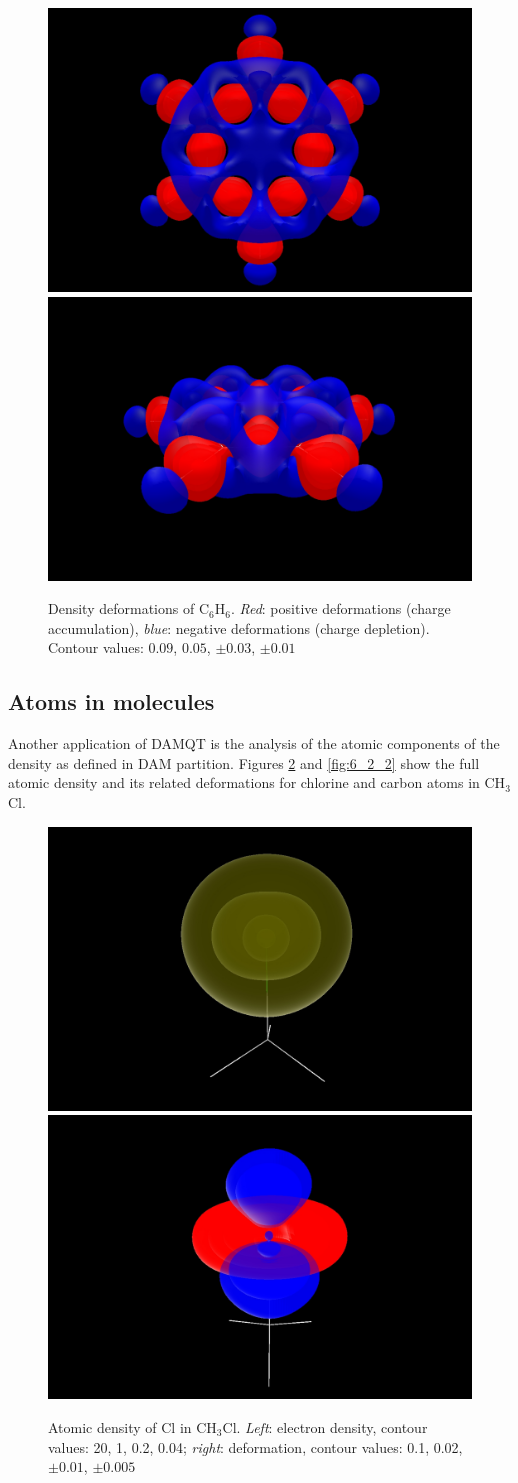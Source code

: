 \documentclass[10pt]{article}
\begin{document}
\begin{figure}[H]
\begin{center}
\includegraphics[width=.33\linewidth]{C6H6-pVTZ-def-1.png}
\hspace*{5mm}
\includegraphics[width=.33\linewidth]{C6H6-pVTZ-def-2.png}
\vspace*{0.cm}
\end{center}
\caption[Density deformations of C$_6$H$_6$]{ Density deformations of C$_6$H$_6$. {\it Red}: positive deformations
(charge accumulation),
{\it blue}: negative deformations (charge depletion). Contour values:
$0.09$, $0.05$, $\pm 0.03$, $\pm 0.01$ \label{fig:6_1_4}}
\end{figure}

\subsection{Atoms in molecules \label{sec:6.2}}

Another application of DAMQT is the analysis of the atomic components
of the density as defined in DAM partition. Figures \ref{fig:6_2_1} and
\ref{fig:6_2_2} show the full atomic density and its related deformations for
chlorine and carbon atoms in CH$_3$Cl.

\begin{figure}[H]
\begin{center}
\includegraphics[width=.31\linewidth]{CH3Cl-pVTZ-d-Cl.png}
\hspace*{5mm}
\includegraphics[width=.31\linewidth]{CH3Cl-pVTZ-def-Cl-upp.png}
\end{center}
\caption[Atomic density of Cl in CH$_3$Cl]{ Atomic density of Cl in CH$_3$Cl. {\it Left}: electron density,
contour values: 20, 1, 0.2, 0.04; {\it right}: deformation, contour values:
0.1, 0.02, $\pm 0.01$, $\pm 0.005$
\label{fig:6_2_1}}
\end{figure}
\end{document}
